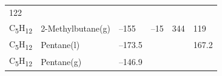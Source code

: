\documentclass[
  9pt,
]{extbook}
\theoremstyle{definition}
\theoremstyle{definition}
\theoremstyle{definition}
\theoremstyle{remark}
\begin{document}
\begin{longtable}[]{@{}llllll@{}}
\begin{minipage}[t]{0.14\columnwidth}
122\strut
\end{minipage}\tabularnewline
\begin{minipage}[t]{0.07\columnwidth}\raggedright
C\textsubscript{5}H\textsubscript{12}\strut
\end{minipage} & \begin{minipage}[t]{0.17\columnwidth}\raggedright
2-Methylbutane(g)\strut
\end{minipage} & \begin{minipage}[t]{0.15\columnwidth}\raggedright
--155\strut
\end{minipage} & \begin{minipage}[t]{0.15\columnwidth}\raggedright
--15\strut
\end{minipage} & \begin{minipage}[t]{0.14\columnwidth}\raggedright
344\strut
\end{minipage} & \begin{minipage}[t]{0.14\columnwidth}\raggedright
119\strut
\end{minipage}\tabularnewline
\begin{minipage}[t]{0.07\columnwidth}\raggedright
C\textsubscript{5}H\textsubscript{12}\strut
\end{minipage} & \begin{minipage}[t]{0.17\columnwidth}\raggedright
Pentane(l)\strut
\end{minipage} & \begin{minipage}[t]{0.15\columnwidth}\raggedright
--173.5\strut
\end{minipage} & \begin{minipage}[t]{0.15\columnwidth}\raggedright
\strut
\end{minipage} & \begin{minipage}[t]{0.14\columnwidth}\raggedright
\strut
\end{minipage} & \begin{minipage}[t]{0.14\columnwidth}\raggedright
167.2\strut
\end{minipage}\tabularnewline
\begin{minipage}[t]{0.07\columnwidth}\raggedright
C\textsubscript{5}H\textsubscript{12}\strut
\end{minipage} & \begin{minipage}[t]{0.17\columnwidth}\raggedright
Pentane(g)\strut
\end{minipage} & \begin{minipage}[t]{0.15\columnwidth}\raggedright
--146.9\strut
\end{minipage} & \begin{minipage}[t]{0.15\columnwidth}\raggedright

\end{minipage}
\end{longtable}
\end{document}
